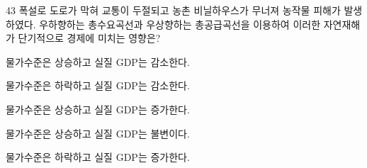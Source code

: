 \begin{question}{43}
폭설로 도로가 막혀 교통이 두절되고 농촌 비닐하우스가 무너져 농작물 피해가 발생하였다. 우하향하는 총수요곡선과 우상향하는 총공급곡선을 이용하여 이러한 자연재해가 단기적으로 경제에 미치는 영향은?
\begin{choices}
  \item 물가수준은 상승하고 실질 GDP는 감소한다.
  \item 물가수준은 하락하고 실질 GDP는 감소한다.
  \item 물가수준은 상승하고 실질 GDP는 증가한다.
  \item 물가수준은 상승하고 실질 GDP는 불변이다.
  \item 물가수준은 하락하고 실질 GDP는 증가한다.
\end{choices}
\end{question}
